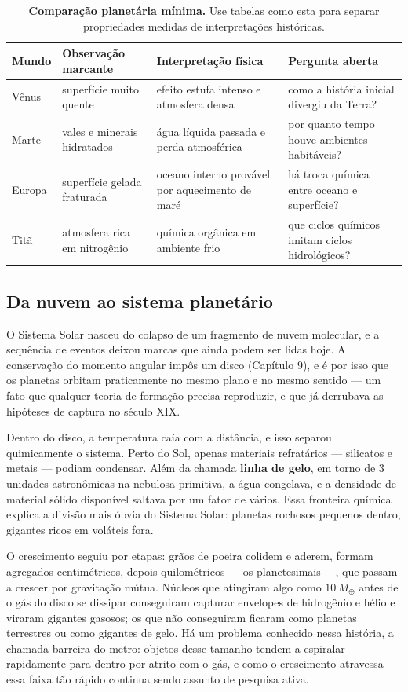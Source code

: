 \documentclass[11pt,a4paper]{article}
\begin{document}
\begin{longtable}{>{\raggedright\arraybackslash}p{2.6cm}>{\raggedright\arraybackslash}p{3.2cm}>{\raggedright\arraybackslash}p{4.2cm}>{\raggedright\arraybackslash}p{4cm}}
\caption{\textbf{Comparação planetária mínima.} Use tabelas como esta para separar propriedades medidas de interpretações históricas.}\\
\toprule
Mundo & Observação marcante & Interpretação física & Pergunta aberta \\
\midrule
Vênus & superfície muito quente & efeito estufa intenso e atmosfera densa & como a história inicial divergiu da Terra? \\
Marte & vales e minerais hidratados & água líquida passada e perda atmosférica & por quanto tempo houve ambientes habitáveis? \\
Europa & superfície gelada fraturada & oceano interno provável por aquecimento de maré & há troca química entre oceano e superfície? \\
Titã & atmosfera rica em nitrogênio & química orgânica em ambiente frio & que ciclos químicos imitam ciclos hidrológicos? \\
\bottomrule
\end{longtable}

\subsection*{Da nuvem ao sistema planetário}

O Sistema Solar nasceu do colapso de um fragmento de nuvem molecular, e a sequência de eventos deixou marcas que ainda podem ser lidas hoje. A conservação do momento angular impôs um disco (Capítulo 9), e é por isso que os planetas orbitam praticamente no mesmo plano e no mesmo sentido --- um fato que qualquer teoria de formação precisa reproduzir, e que já derrubava as hipóteses de captura no século XIX.

Dentro do disco, a temperatura caía com a distância, e isso separou quimicamente o sistema. Perto do Sol, apenas materiais refratários --- silicatos e metais --- podiam condensar. Além da chamada \textbf{linha de gelo}, em torno de $3$ unidades astronômicas na nebulosa primitiva, a água congelava, e a densidade de material sólido disponível saltava por um fator de vários. Essa fronteira química explica a divisão mais óbvia do Sistema Solar: planetas rochosos pequenos dentro, gigantes ricos em voláteis fora.

O crescimento seguiu por etapas: grãos de poeira colidem e aderem, formam agregados centimétricos, depois quilométricos --- os planetesimais ---, que passam a crescer por gravitação mútua. Núcleos que atingiram algo como $10\,M_\oplus$ antes de o gás do disco se dissipar conseguiram capturar envelopes de hidrogênio e hélio e viraram gigantes gasosos; os que não conseguiram ficaram como planetas terrestres ou como gigantes de gelo. Há um problema conhecido nessa história, a chamada barreira do metro: objetos desse tamanho tendem a espiralar rapidamente para dentro por atrito com o gás, e como o crescimento atravessa essa faixa tão rápido continua sendo assunto de pesquisa ativa.
\end{document}
